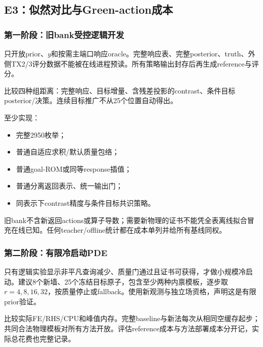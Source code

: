 \documentclass[
  10pt,
  a4paper,
]{article}
\providecommand{\tightlist}{%
  \setlength{\itemsep}{0pt}\setlength{\parskip}{0pt}}
\providecommand{\tightlist}{\setlength{\itemsep}{1pt}\setlength{\parskip}{1pt}}
\begin{document}
\hypertarget{e3ux4f3cux7136ux5bf9ux6bd4ux4e0egreen-actionux6210ux672c}{%
\subsection{E3：似然对比与Green-action成本}\label{e3ux4f3cux7136ux5bf9ux6bd4ux4e0egreen-actionux6210ux672c}}

\hypertarget{ux7b2cux4e00ux9636ux6bb5ux65e7bankux53d7ux63a7ux903bux8f91ux5f00ux53d1}{%
\subsubsection{第一阶段：旧bank受控逻辑开发}\label{ux7b2cux4e00ux9636ux6bb5ux65e7bankux53d7ux63a7ux903bux8f91ux5f00ux53d1}}

只开放prior、\(y\)和按需主端口响应oracle。完整响应表、完整posterior、truth、外侧TX2/3评分数据不能被在线进程预读。所有策略输出封存后再生成reference与评分。

比较四种组距离：完整响应、目标增量、含残差投影的contrast、条件目标posterior/决策。连续目标推广不从25个位置自动得出。

至少实现：

\begin{itemize}
\tightlist
\item
  完整2950枚举；
\item
  普通自适应求积/默认质量包络；
\item
  普通goal-ROM或同等response插值；
\item
  普通分离返回表示、统一输出门；
\item
  同表示下contrast精度与条件目标共识策略。
\end{itemize}

旧bank不含新返回actions或算子导数；需要新物理的证书不能凭全表离线拟合冒充在线已知。任何teacher/offline统计都在成本单列并给所有基线同权。

\hypertarget{ux7b2cux4e8cux9636ux6bb5ux6709ux9650ux51b7ux542fux52a8pde}{%
\subsubsection{第二阶段：有限冷启动PDE}\label{ux7b2cux4e8cux9636ux6bb5ux6709ux9650ux51b7ux542fux52a8pde}}

只有逻辑实验显示非平凡查询减少、质量门通过且证书可获得，才做小规模冷启动。建议8个新墙、25个冻结目标原子，包含至少两种内禀模板，逐步取\(r=4,8,16,32\)，按质量停止或fallback。使用新观测与独立场资格，声明这是有限prior验证。

比较实际FE/RHS/CPU和峰值内存。完整baseline与新法每次从相同空缓存起步；共同合法物理模板对所有方法开放。评估reference成本与方法部署成本分开记，实际总花费也完整记录。
\end{document}
